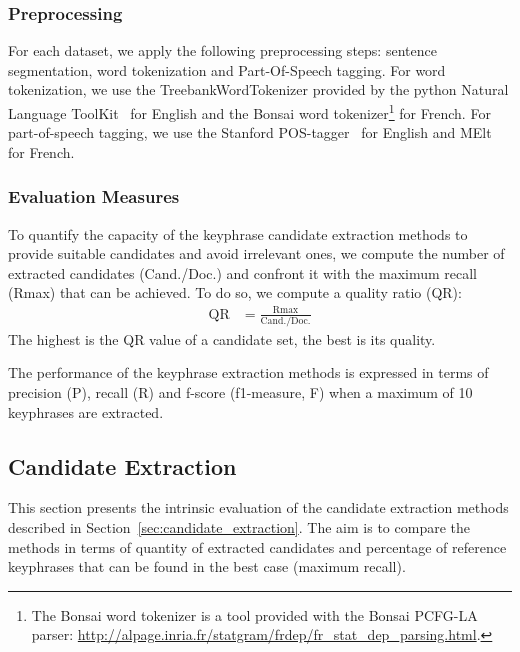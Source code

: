     \subsubsection{Preprocessing}
    \label{subsubsec:preprocessing}
      For each dataset, we apply the following preprocessing steps: sentence
      segmentation, word tokenization and Part-Of-Speech tagging. For word
      tokenization, we use the TreebankWordTokenizer provided by the python
      Natural Language ToolKit~\cite{bird2009nltk} for English and the Bonsai
      word tokenizer\footnote{The Bonsai word tokenizer is a tool provided with
      the Bonsai PCFG-LA parser:
      \url{http://alpage.inria.fr/statgram/frdep/fr_stat_dep_parsing.html}.} for
      French. For part-of-speech tagging, we use the Stanford
      POS-tagger~\cite{toutanova2003stanfordpostagger} for English and
      MElt~\cite{denis2009melt} for French.

    \subsubsection{Evaluation Measures}
    \label{subsubsec:keyphrase_extraction_evaluation_measures}
      To quantify the capacity of the keyphrase candidate extraction methods to
      provide suitable candidates and avoid irrelevant ones, we compute the
      number of extracted candidates (Cand./Doc.) and confront it with the
      maximum recall (Rmax) that can be achieved. To do so, we compute a quality
      ratio (QR):
      \begin{align}
        \text{QR} &= \frac{\text{Rmax}}{\text{Cand./Doc.}}
      \end{align}
      The highest is the QR value of a candidate set, the best is its quality.

      The performance of the keyphrase extraction methods is expressed in terms
      of precision (P), recall (R) and f-score (f1-measure, F) when a maximum of
      10 keyphrases are extracted.

  \subsection{Candidate Extraction}
  \label{subsec:candidate_extraction}

    This section presents the intrinsic evaluation of the candidate extraction
    methods described in Section~\ref{sec:candidate_extraction}. The aim is to
    compare the methods in terms of quantity of extracted candidates and
    percentage of reference keyphrases that can be found in the best case
    (maximum recall).

